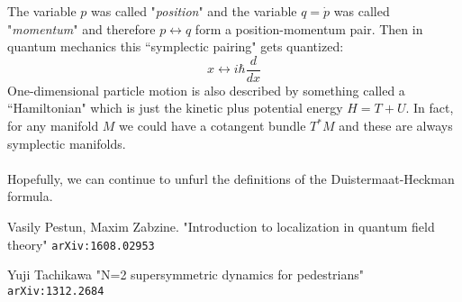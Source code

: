 \documentclass[12pt]{article}
\begin{document}
The variable $p$ was called "\textit{position}" and the variable $q = \dot{p}$ was called "\textit{momentum}" and therefore $p \leftrightarrow q$ form a position-momentum pair.  Then in quantum mechanics this ``symplectic pairing" gets quantized:
$$ x \leftrightarrow i\hbar\frac{d}{dx} $$
One-dimensional particle motion is also described by something called a ``Hamiltonian" which is just the kinetic plus potential energy $H = T + U$.  In fact, for any manifold $M$ we could have a cotangent bundle $T^\ast M$ and these are always symplectic manifolds.   \\ \\
Hopefully, we can continue to unfurl the definitions of the Duistermaat-Heckman formula.
\vfill

\begin{thebibliography}{}

\item Vasily Pestun, Maxim Zabzine. 
"Introduction to localization in quantum field theory" \texttt{arXiv:1608.02953}

\item Yuji Tachikawa "N=2 supersymmetric dynamics for pedestrians" \texttt{arXiv:1312.2684}
\end{thebibliography}

\newpage
\end{document}
